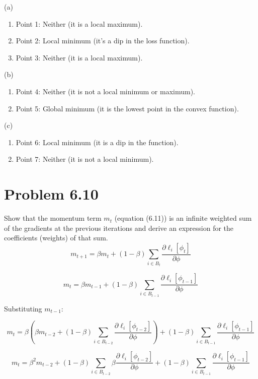 \documentclass[10pt]{article}
\begin{document}
(a)
\begin{enumerate}
    \item Point 1: Neither (it is a local maximum).
    \item Point 2: Local minimum (it's a dip in the loss function).
    \item Point 3: Neither (it is a local maximum).
\end{enumerate}
(b)
\begin{enumerate}
    \item Point 4: Neither (it is not a local minimum or maximum).
    \item Point 5: Global minimum (it is the lowest point in the convex function).
\end{enumerate}
(c) 
\begin{enumerate}
    \item Point 6: Local minimum (it is a dip in the function).
    \item Point 7: Neither (it is not a local minimum).
\end{enumerate}

\vspace{5em}

\section*{Problem 6.10}
Show that the momentum term \( m_t \) (equation (6.11)) is an infinite weighted sum of the gradients at the previous iterations and derive an expression for the coefficients (weights) of that sum.
\begin{equation}
    m_{t+1} = \beta m_t + (1 - \beta) \sum_{i \in B_t} \frac{\partial \ell_i [\phi_t]}{\partial \phi}
\end{equation}


\begin{equation}
    m_t = \beta m_{t-1} + (1 - \beta) \sum_{i \in B_{t-1}} \frac{\partial \ell_i [\phi_{t-1}]}{\partial \phi}
\end{equation}

Substituting \( m_{t-1} \):

\begin{equation}
    m_t = \beta (\beta m_{t-2} + (1 - \beta) \sum_{i \in B_{t-2}} \frac{\partial \ell_i [\phi_{t-2}]}{\partial \phi}) + (1 - \beta) \sum_{i \in B_{t-1}} \frac{\partial \ell_i [\phi_{t-1}]}{\partial \phi}
\end{equation}


\begin{equation}
    m_t = \beta^2 m_{t-2} + (1 - \beta) \sum_{i \in B_{t-2}} \beta \frac{\partial \ell_i [\phi_{t-2}]}{\partial \phi} + (1 - \beta) \sum_{i \in B_{t-1}} \frac{\partial \ell_i [\phi_{t-1}]}{\partial \phi}
\end{equation}
\end{document}
